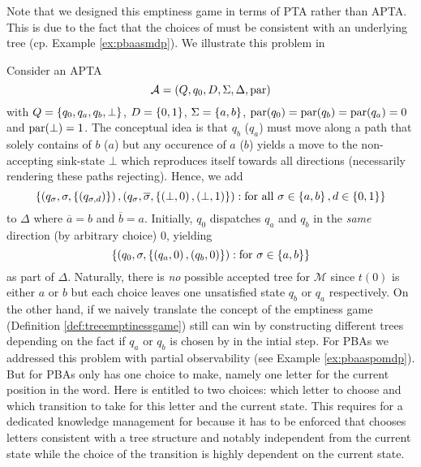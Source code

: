 Note that we designed this emptiness game in terms of \ac{PTA} rather than 
\ac{APTA}. This is due to the fact that the choices of \eve{} must be 
consistent with an underlying tree (cp. Example \ref{ex:pbaasmdp}). We 
illustrate this problem in
\begin{example}
  Consider an \ac{APTA}
  \begin{equation*}
    \mathcal{A} = \left(Q, q_{0}, D, \Sigma, \Delta, \operatorname{par}\right)
  \end{equation*}
  with $Q = \left\{q_{0}, q_{a}, q_{b}, \bot\right\}$, $D = \left\{0,1\right\}$, 
  $\Sigma = \left\{a, b\right\}$, $\operatorname{par}(q_{0}) = \operatorname{par}(q_{b}) = \operatorname{par}(q_{a}) 
    = 0$ and $\operatorname{par}(\bot) = 1$. The conceptual idea is that $q_{b}$ ($q_{a}$) 
  must move along a path that solely contains of $b$ ($a$) but any occurence of 
  $a$ ($b$) yields a move to the non-accepting sink-state $\bot$ which 
  reproduces itself towards all directions (necessarily rendering these paths
  rejecting). Hence, we add 
  \begin{equation*}
    \left\{
      \left(q_{\sigma}, \sigma, \left\{\left(q_{\sigma, d}\right)\right\}\right),
      \left(q_{\sigma}, \overline{\sigma}, \left\{\left(\bot, 0\right), 
        \left(\bot, 1\right)\right\}\right):\text{for all }\sigma\in\left\{a,b\right\}, d\in\left\{0,1\right\}
    \right\}
  \end{equation*}
  to $\Delta$ where $\overline{a} = b$ and $\overline{b} = a$. Initially, 
  $q_{0}$ dispatches $q_{a}$ and $q_{b}$ in the \emph{same} direction (by 
  arbitrary choice) $0$, yielding
  \begin{equation*}
    \left\{
      \left(q_{0}, \sigma, \left\{\left(q_{a}, 0\right), \left(q_{b}, 0\right)\right\}\right):
        \text{for }\sigma\in\left\{a, b\right\}
      \right\}
  \end{equation*}
  as part of $\Delta$. Naturally, there is \emph{no} possible accepted tree for 
  $\mathcal{M}$ since $t(0)$ is either $a$ or $b$ but each choice leaves one
  unsatisfied state $q_{b}$ or $q_{a}$ respectively. On the other hand, if we
  naively translate the concept of the emptiness game (Definition 
  \ref{def:treeemptinessgame}) \eve{} still can win by constructing 
  different trees depending on the fact if $q_{a}$ or $q_{b}$ is chosen by 
  \adam{} in the intial step. For \acp{PBA} we addressed this problem 
  with partial observability (see Example \ref{ex:pbaaspomdp}). But for 
  \acp{PBA} \eve{} only has one choice to make, namely one letter for the 
  current position in the word. Here \eve{} is entitled to two choices: which
  letter to choose and which transition to take for this letter and the current
  state. This requires for a dedicated knowledge management for \eve{} because
  it has to be enforced that \eve{} chooses letters consistent with a tree 
  structure and notably independent from the current state while the choice
  of the transition is highly dependent on the current state.
  \label{ex:alternatingtreeemptiness}
\end{example}
